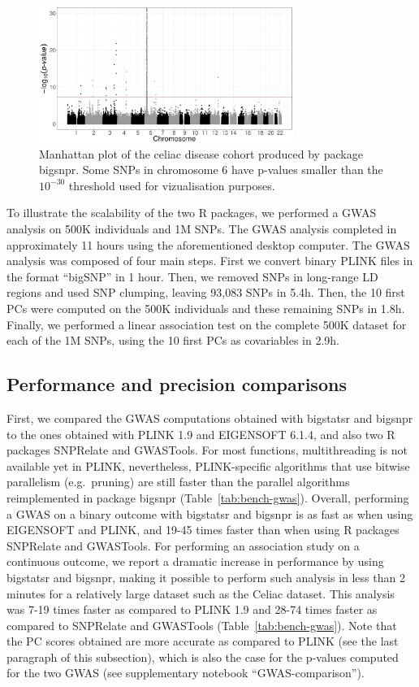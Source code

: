 \documentclass{bioinfo}
\begin{document}
\begin{figure}[!tpb]
\centerline{\includegraphics[width=235pt]{celiac-gwas-cut}}
\caption{Manhattan plot of the celiac disease cohort produced by package bigsnpr. Some SNPs in chromosome 6 have p-values smaller than the $10^{-30}$ threshold used for vizualisation purposes.}\label{fig:gwas}
\end{figure}

To illustrate the scalability of the two R packages, we performed a GWAS analysis on 500K individuals and 1M SNPs. The GWAS analysis completed in approximately 11 hours using the aforementioned desktop computer. The GWAS analysis was composed of four main steps. 
First we convert binary PLINK files in the format ``bigSNP'' in 1 hour.
Then, we removed SNPs in long-range LD regions and used SNP clumping, leaving 93,083 SNPs in 5.4h. Then, the 10 first PCs were computed on the 500K individuals and these remaining SNPs in 1.8h. Finally, we performed a linear association test on the complete 500K dataset for each of the 1M SNPs, using the 10 first PCs as covariables in 2.9h.

\subsection{Performance and precision comparisons}

First, we compared the GWAS computations obtained with bigstatsr and bigsnpr to the ones obtained with PLINK 1.9 and EIGENSOFT 6.1.4, and also two R packages SNPRelate and GWASTools.
For most functions, multithreading is not available yet in PLINK, nevertheless, PLINK-specific algorithms that use bitwise parallelism (e.g.\ pruning) are still faster than the parallel algorithms reimplemented in package bigsnpr (Table~\ref{tab:bench-gwas}). 
Overall, performing a GWAS on a binary outcome with bigstatsr and bigsnpr is as fast as when using EIGENSOFT and PLINK, and 19-45 times faster than when using R packages SNPRelate and GWASTools. 
For performing an association study on a continuous outcome, we report a dramatic increase in performance by using bigstatsr and bigsnpr, making it possible to perform such analysis in less than 2 minutes for a relatively large dataset such as the Celiac dataset. This analysis was 7-19 times faster as compared to PLINK 1.9 and 28-74 times faster as compared to SNPRelate and GWASTools (Table~\ref{tab:bench-gwas}).
Note that the PC scores obtained are more accurate as compared to PLINK (see the last paragraph of this subsection), which is also the case for the p-values computed for the two GWAS (see supplementary notebook ``GWAS-comparison''). 
\end{document}

